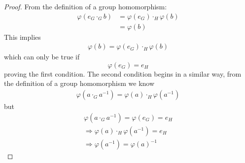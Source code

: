\documentclass{article}
\theoremstyle{definition}
\theoremstyle{remark}
\begin{document}
\begin{proof}
From the definition of a group homomorphism:
\begin{align*}
\varphi(e_G\cdot_Gb)&=\varphi(e_G)\cdot_H\varphi(b)\\
&=\varphi(b)
\end{align*}
This implies
\begin{align*}
\varphi(b)=\varphi(e_G)\cdot_H\varphi(b)
\end{align*}
which can only be true if
\begin{equation}
\varphi(e_G)=e_H
\end{equation}
proving the first condition. The second condition begins in a similar way, from the definition of a group homomorphism we know
\begin{align*}
\varphi(a\cdot_G a^{-1})=\varphi(a)\cdot_H\varphi(a^{-1})
\end{align*}
but 
\begin{align*}
\varphi(a\cdot_Ga^{-1})=\varphi(e_G)=e_H\\
\Rightarrow \varphi(a)\cdot_H\varphi(a^{-1})=e_H\\
\Rightarrow \varphi(a^{-1})=\varphi(a)^{-1}
\end{align*}
\end{proof}
\end{document}
